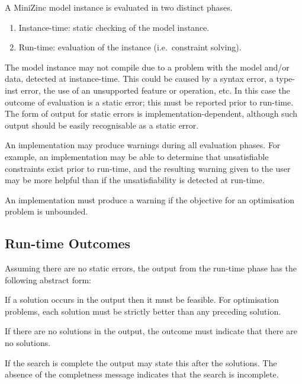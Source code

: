 \documentclass[10pt]{scrartcl}
\newcommand{\pjs}[1]{\textcolor{blue}{PJS:#1}}
\begin{document}
A MiniZinc model instance is evaluated in two distinct phases.
\begin{enumerate}
\item Instance-time: static checking of the model instance.
\item Run-time: evaluation of the instance (i.e.~constraint solving).
\end{enumerate}
%

The model instance may not compile due to a problem with the model and/or data,
detected at instance-time.
This could be caused by a syntax error, a type-inst error,
the use of an unsupported feature or operation, etc.
In this case the outcome of evaluation is a static error;
this must be reported prior to run-time.
The form of output for static errors is implementation-dependent,
although such output should be easily recognisable as a static error.

An implementation may produce warnings during all evaluation phases.
For example, an implementation may be able to determine that
unsatisfiable constraints exist prior to run-time,
and the resulting warning given to the user may be more helpful than
if the unsatisfiability is detected at run-time.

An implementation must produce a warning
if the objective for an optimisation problem is unbounded.


\subsection{Run-time Outcomes}
    \label{Run-time Outcomes}
Assuming there are no static errors,
the output from the run-time phase has the following abstract form:

\begin{productions}
\RuleOutput 
\end{productions}

If a solution occurs in the output
then it must be feasible.
For optimisation problems,
each solution must be strictly better than any preceding solution.

If there are no solutions in the output,
the outcome must indicate that there are no solutions.

If the search is complete the output may state this after the solutions.
The absence of the completness message indicates that the search is incomplete.
\end{document}
